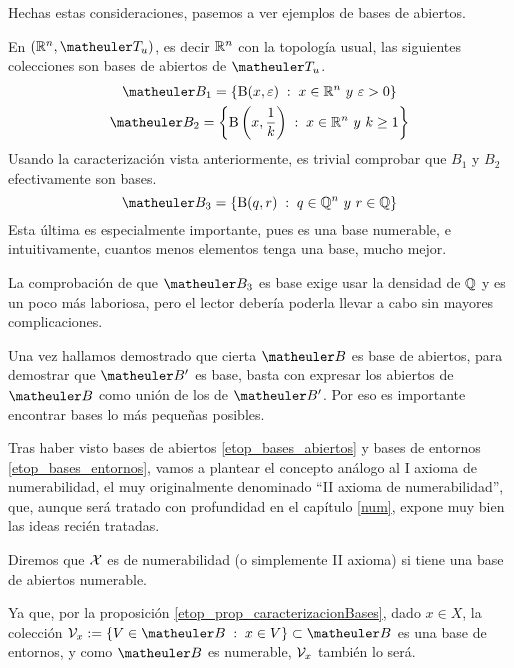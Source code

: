 Hechas estas consideraciones, pasemos a ver ejemplos de bases de abiertos.
\begin{exa}
	\label{etop_bases}
	En $( \R^n,\T_u )$, es decir $\mathbb{R}^n$ con la topología usual, las siguientes colecciones son bases de abiertos de $\T_u$.
 	 \begin{gather}
 	 	\B_1=\{\bola(x, \varepsilon) \midc x \in \R^n\ y \ \varepsilon > 0\}\\
 	 	\B_2=\left\{\bola\left(x, \frac{1}{k}\right) \midc x \in \R^n\ y \ k \geq 1\right\}
 	 \end{gather}
	 Usando la caracterización vista anteriormente, es trivial comprobar que $B_1$ y $B_2$ efectivamente son bases.
	 \begin{equation}
	 	\B_3=\{\bola(q, r) \midc q \in \Q^n\ y \ r \in \Q\}
	 \end{equation}
	 Esta última es especialmente importante, pues es una base numerable, e intuitivamente, cuantos menos elementos tenga una base, mucho mejor.
	 
	 La comprobación de que $\B_3$ es base exige usar la densidad de $\mathbb{Q}$ y es un poco más laboriosa, pero el lector debería poderla llevar a cabo sin mayores complicaciones.
\end{exa}
\begin{obs}
	Una vez hallamos demostrado que cierta $\B$ es base de abiertos, para demostrar que $\B'$ es base, basta con expresar los abiertos de $\B$ como unión de los de $\B'$. Por eso es importante encontrar bases lo más pequeñas posibles.  \qedhere
\end{obs}

Tras haber visto bases de abiertos \ref{etop_bases_abiertos} y bases de entornos \ref{etop_bases_entornos}, vamos a plantear el concepto análogo al I axioma de numerabilidad, el muy originalmente denominado ``II axioma de numerabilidad'', que, aunque será tratado con profundidad en el capítulo \ref{num}, expone muy bien las ideas recién tratadas.
 
\begin{defi}
	\label{etop_2_axioma_num}
	Diremos que $\mathcal{X}$ es  de numerabilidad (o simplemente II axioma) si tiene una base de abiertos numerable.

\end{defi}
\begin{obs}
	\label{etop_2_axioma_sep}
	Ya que, por la proposición \ref{etop_prop_caracterizacionBases}, dado $x\in X$, la colección $\V_x:=\{V\in\B\midc x\in V\}\subset\B$ es una base de entornos, y como $\B$ es numerable, $\mathcal{V}_x$ también lo será.
\end{obs}

